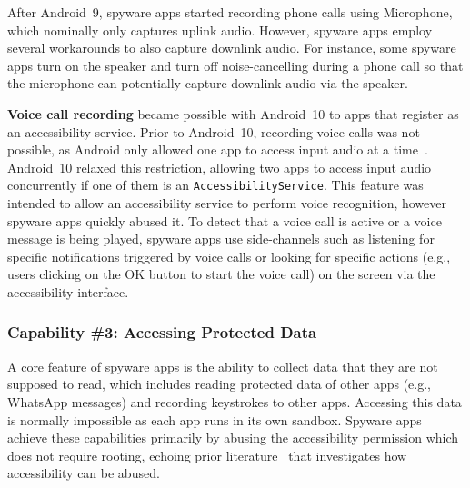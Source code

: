 \documentclass[sigconf,balance=false]{acmart}
\newcommand{\alex}[1]{\textcolor{chicagomaroon}{\noindent[AL: #1]}}
\newcommand{\geoff}[1]{\textcolor{purple}{\noindent[GV: #1]}}
\newcommand{\alex}[1]{}
\newcommand{\geoff}[1]{}
\begin{document}
After Android~9, spyware apps started recording phone calls using
Microphone, which nominally only captures uplink audio.  However, spyware apps
employ several workarounds to also capture downlink audio.  For instance, some
spyware apps turn on the speaker and turn off noise-cancelling during a phone
call so that the microphone can potentially capture downlink audio via the
speaker.


\textbf{Voice call recording} became possible with
Android~10 to apps that register as an accessibility service.  Prior to Android~10,
recording voice calls was not possible, as Android only allowed one app to
access input audio at a time~\cite{Sharinga60:online}.  Android~10 relaxed this
restriction, allowing two apps to access input audio concurrently if one of them
is an \texttt{AccessibilityService}.  This feature was intended to allow an
accessibility service to perform voice recognition, however spyware apps quickly
abused it.  To detect that a voice call is active or a voice message is being
played, spyware apps use side-channels such as listening for specific
notifications triggered by voice calls or looking for specific actions (e.g.,
users clicking on the OK button to start the voice call) on the screen via
the accessibility interface.

\subsubsection*{Capability \#3: Accessing Protected Data}
A core feature of spyware apps is the ability to collect data that they
are not supposed to read, which includes reading protected data of other apps (e.g.,
WhatsApp messages) and recording keystrokes to other apps. Accessing this data is normally
impossible as each app runs in its own sandbox. Spyware apps achieve these
capabilities primarily by abusing the accessibility permission which does not
require rooting, echoing prior literature~\cite{fratantonio2017cloak,
kraunelis2013malware, jang2014a11y, diao2019kindness, kalysch2018android,
huang2021a11y, naseri2019accessileaks} that investigates how accessibility can
be abused.
\end{document}
